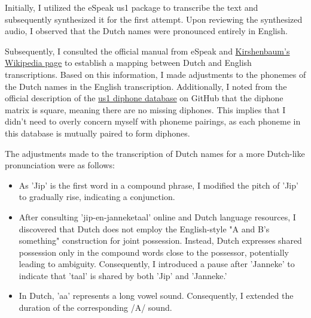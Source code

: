 \documentclass{../labbook}
\begin{document}
\begin{solution}
    Initially, I utilized the eSpeak us1 package to transcribe the text and subsequently synthesized it for the first attempt. Upon reviewing the synthesized audio, I observed that the Dutch names were pronounced entirely in English.

    Subsequently, I consulted the official manual from eSpeak and \href {https://en.wikipedia.org/wiki/Kirshenbaum}{Kirshenbaum's Wikipedia page} to establish a mapping between Dutch and English transcriptions. Based on this information, I made adjustments to the phonemes of the Dutch names in the English transcription. Additionally, I noted from the official description of the \href {https://github.com/numediart/MBROLA-voices/tree/master/data/us1} {us1 diphone database} on GitHub that the diphone matrix is square, meaning there are no missing diphones. This implies that I didn't need to overly concern myself with phoneme pairings, as each phoneme in this database is mutually paired to form diphones.
    
    The adjustments made to the transcription of Dutch names for a more Dutch-like pronunciation were as follows:
    \begin{itemize}
        \item As 'Jip' is the first word in a compound phrase, I modified the pitch of 'Jip' to gradually rise, indicating a conjunction.
        \item After consulting 'jip-en-janneketaal' online and Dutch language resources, I discovered that Dutch does not employ the English-style "A and B's something" construction for joint possession. Instead, Dutch expresses shared possession only in the compound words close to the possessor, potentially leading to ambiguity. Consequently, I introduced a pause after 'Janneke' to indicate that 'taal' is shared by both 'Jip' and 'Janneke.'
        \item In Dutch, 'aa' represents a long vowel sound. Consequently, I extended the duration of the corresponding /A/ sound.
    \end{itemize}
    

\end{solution}
\end{document}
